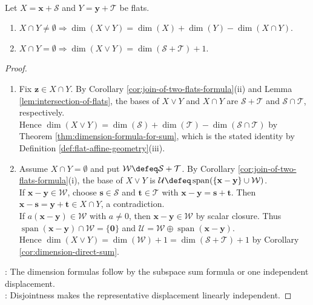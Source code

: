 \begin{corollary} \label{cor:dimension-of-join-of-flats} \\
Let $X=\mathbf{x}+\mathcal{S}$ and $Y=\mathbf{y}+\mathcal{T}$ be flats.
\begin{enumerate}[label=(\roman*)]
\setlength{\itemsep}{0pt}
\item $X\cap Y\neq\emptyset\Rightarrow\dim(X\vee Y)=\dim(X)+\dim(Y)-\dim(X\cap Y)$.
\item $X\cap Y=\emptyset\Rightarrow\dim(X\vee Y)=\dim(\mathcal{S}+\mathcal{T})+1$.
\end{enumerate}
\begin{proof}
\begin{enumerate}[label=(\roman*)]
\setlength{\itemsep}{0pt}
\item Fix $\mathbf{z}\in X\cap Y$. By Corollary \ref{cor:join-of-two-flats-formula}(ii) and Lemma \ref{lem:intersection-of-flats}, the bases of $X\vee Y$ and $X\cap Y$ are $\mathcal{S}+\mathcal{T}$ and $\mathcal{S}\cap\mathcal{T}$, respectively.\\
Hence $\dim(X\vee Y)=\dim(\mathcal{S})+\dim(\mathcal{T})-\dim(\mathcal{S}\cap\mathcal{T})$ by Theorem \ref{thm:dimension-formula-for-sum}, which is the stated identity by Definition \ref{def:flat-affine-geometry}(iii).
\item Assume $X\cap Y=\emptyset$ and put $\mathcal{W}\defeq\mathcal{S}+\mathcal{T}$. By Corollary \ref{cor:join-of-two-flats-formula}(i), the base of $X\vee Y$ is $\mathcal{U}\defeq\operatorname{span}(\{\mathbf{x}-\mathbf{y}\}\cup\mathcal{W})$.\\
If $\mathbf{x}-\mathbf{y}\in\mathcal{W}$, choose $\mathbf{s}\in\mathcal{S}$ and $\mathbf{t}\in\mathcal{T}$ with $\mathbf{x}-\mathbf{y}=\mathbf{s}+\mathbf{t}$. Then $\mathbf{x}-\mathbf{s}=\mathbf{y}+\mathbf{t}\in X\cap Y$, a contradiction.\\
If $a(\mathbf{x}-\mathbf{y})\in\mathcal{W}$ with $a\neq0$, then $\mathbf{x}-\mathbf{y}\in\mathcal{W}$ by scalar closure. Thus $\operatorname{span}(\mathbf{x}-\mathbf{y})\cap\mathcal{W}=\{\mathbf{0}\}$ and $\mathcal{U}=\mathcal{W}\oplus\operatorname{span}(\mathbf{x}-\mathbf{y})$.\\
Hence $\dim(X\vee Y)=\dim(\mathcal{W})+1=\dim(\mathcal{S}+\mathcal{T})+1$ by Corollary \ref{cor:dimension-direct-sum}.
\end{enumerate}
: The dimension formulas follow by the subspace sum formula or one independent displacement.\\
: Disjointness makes the representative displacement linearly independent.
\end{proof}
\end{corollary}
